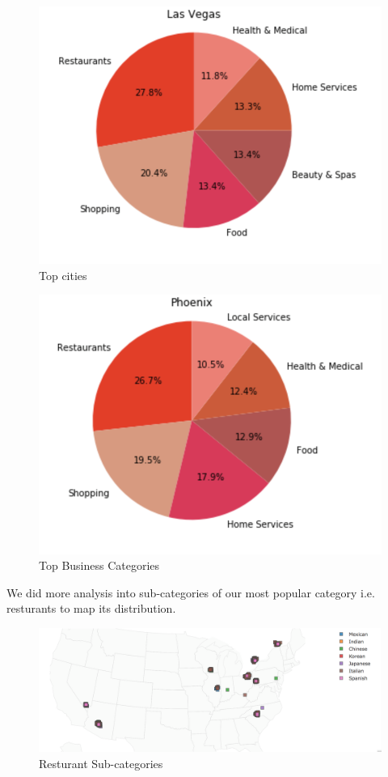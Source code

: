 \documentclass[11pt]{article}
\begin{document}
     	\begin{figure}[h]
     		\centering
     		\includegraphics[scale=0.7] {top_cities.png}
     		\caption{Top cities}
     	\end{figure}
	     \begin{figure}[h]
	     	\centering
	     	\includegraphics[scale=0.7] {top_categroies.png}
	     	\caption{Top Business Categories}
	     \end{figure}
     We did more analysis into sub-categories of our most popular category i.e. resturants to map its distribution.
      \begin{figure}[h]
     	\centering
     	\includegraphics[scale=0.5] {category_map.png}
     	\caption{Resturant Sub-categories}
     \end{figure}
      
\end{document}
